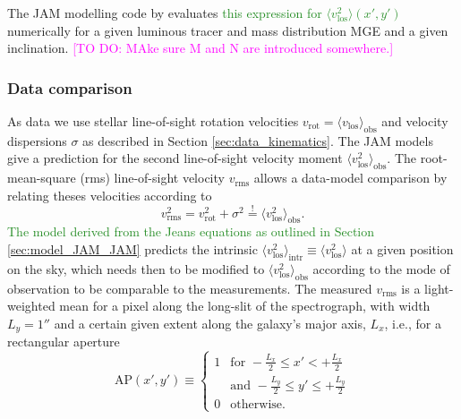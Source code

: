 \documentclass[useAMS,usenatbib]{mnras}
\newcommand{\Wilma}[1]{\textcolor{Magenta}{#1}}
\newcommand{\NEW}[1]{\textcolor{ForestGreen}{#1}}
\newcommand{\OLD}[1]{}
\begin{document}
The JAM modelling code by \citet{Cap08} evaluates \OLD{Equation \eqref{eq:explicitLOSvelCap}}\NEW{this expression for $\langle v_\text{los}^2\rangle(x',y')$} numerically for a given luminous tracer and mass distribution MGE and a given inclination.
\Wilma{[TO DO: MAke sure M and N are introduced somewhere.]}

\subsubsection{Data comparison} \label{sec:model_JAM_compare}

As data we use stellar line-of-sight rotation velocities $v_\text{rot} = \langle v_\text{los} \rangle_\text{obs}$ and velocity dispersions $\sigma$ as described in Section \ref{sec:data_kinematics}. The JAM models give a prediction for the second line-of-sight velocity moment $\langle v_\text{los}^2 \rangle_\text{obs}$. The root-mean-square (rms) line-of-sight velocity $v_\text{rms}$ allows a data-model comparison by relating theses velocities according to 
\begin{equation*}
 v_\text{rms}^2 = v_\text{rot}^2 + \sigma^2  \stackrel{!}{=} \langle v_\text{los}^2 \rangle_\text{obs}.
\end{equation*}
\OLD{The model in Equation \eqref{eq:explicitLOSvelCap}}\NEW{The model derived from the Jeans equations as outlined in Section \ref{sec:model_JAM_JAM}} predicts the intrinsic $\langle v_\text{los}^2 \rangle_\text{intr}\equiv\langle v_\text{los}^2\rangle$ at a given position on the sky, which needs then to be modified to $\langle v_\text{los}^2 \rangle_\text{obs}$ according to the mode of observation to be comparable to the measurements. The measured $v_\text{rms}$ is a light-weighted mean for a pixel along the long-slit of the spectrograph, with width $L_y = 1''$ \citep{SWELLSV} and a certain given extent along the galaxy's major axis, $L_x$, i.e., for a rectangular aperture
\begin{equation*}
\text{AP}(x',y') \equiv \left\{ \begin{array}{ll} 1 & \text{for } -\frac{L_x}{2} \leq x' < + \frac{L_x}{2}\\
& \text{and } - \frac{L_y}{2} \leq y' \leq + \frac{L_y}{2}  \\ 0 & \text{otherwise.} \end{array} \right.
\end{equation*}
\end{document}
